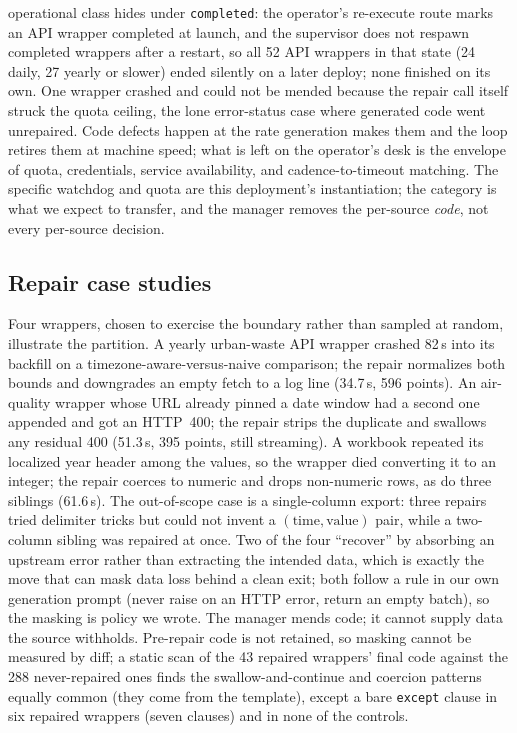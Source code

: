 \documentclass[conference]{IEEEtran}
\begin{document}
operational class hides under \texttt{completed}: the operator's re-execute route
marks an API wrapper completed at launch, and the supervisor does not respawn
completed wrappers after a restart, so all 52 API wrappers in that state (24 daily, 27
yearly or slower) ended silently on a later deploy; none finished on its own. One wrapper
crashed and could not be mended because the repair call itself struck the quota
ceiling, the lone error-status case where generated code went unrepaired. Code
defects happen at the rate generation makes them and the loop retires them at machine
speed; what is left on the operator's desk is the envelope of quota, credentials,
service availability, and cadence-to-timeout matching. The specific watchdog and
quota are this deployment's instantiation; the category is what we expect to
transfer, and the manager removes the per-source \emph{code}, not every per-source
decision.

\subsection{Repair case studies}
\label{sec:res-cases}
Four wrappers, chosen to exercise the boundary rather than sampled at random,
illustrate the partition. A yearly urban-waste API wrapper crashed 82\,s into its
backfill on a timezone-aware-versus-naive comparison; the repair normalizes both
bounds and downgrades an empty fetch to a log line (34.7\,s, 596 points). An
air-quality wrapper whose URL already pinned a date window had a second one appended
and got an HTTP~400; the repair strips the duplicate and swallows any residual 400
(51.3\,s, 395 points, still streaming). A workbook repeated its localized year header
among the values, so the wrapper died converting it to an integer; the repair coerces
to numeric and drops non-numeric rows, as do three siblings (61.6\,s). The
out-of-scope case is a single-column export: three repairs tried delimiter tricks but
could not invent a $(\textrm{time},\textrm{value})$ pair, while a two-column sibling
was repaired at once. Two of the four ``recover'' by absorbing an upstream error rather than extracting
the intended data, which is exactly the move that can mask data loss behind a clean
exit; both follow a rule in our own generation prompt (never raise on an HTTP error,
return an empty batch), so the masking is policy we wrote. The manager mends code;
it cannot supply data the source withholds. Pre-repair code is not retained, so masking cannot be measured
by diff; a static scan of the 43 repaired wrappers' final code against the 288
never-repaired ones finds the swallow-and-continue and coercion patterns equally
common (they come from the template), except a bare \texttt{except} clause in six
repaired wrappers (seven clauses) and in none of the controls.
\end{document}
